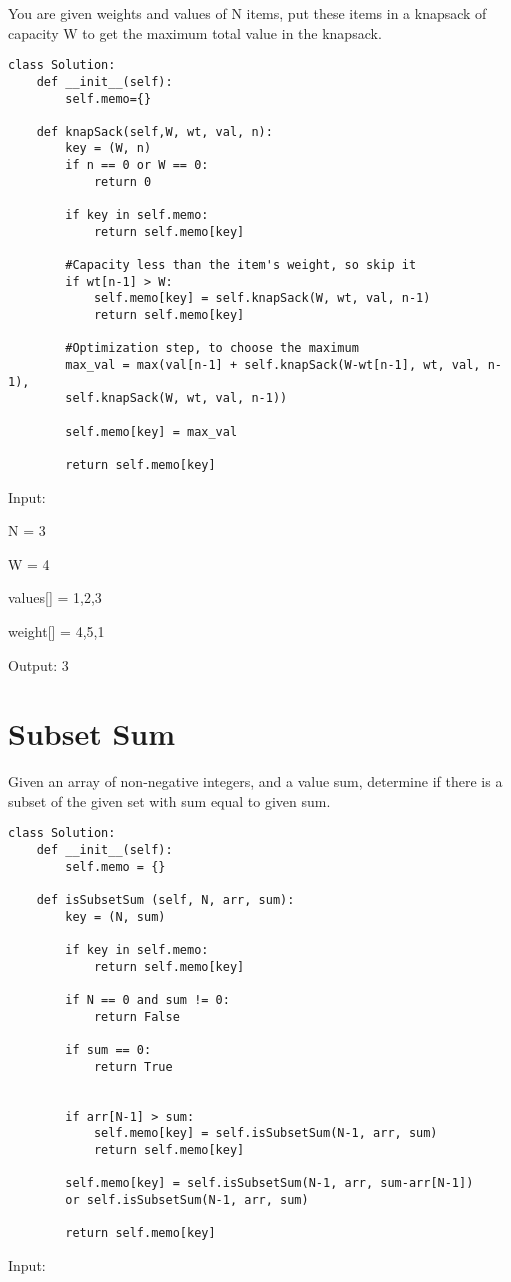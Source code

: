 \documentclass[24pt, a4]{article}
\begin{document}
You are given weights and values of N items, put these items in a knapsack of capacity W to get the maximum total value in the knapsack. 



\begin{lstlisting}
class Solution:
    def __init__(self):
        self.memo={}

    def knapSack(self,W, wt, val, n):
        key = (W, n)
        if n == 0 or W == 0:
            return 0
            
        if key in self.memo:
            return self.memo[key]
        
        #Capacity less than the item's weight, so skip it    
        if wt[n-1] > W:
            self.memo[key] = self.knapSack(W, wt, val, n-1)
            return self.memo[key]
        
        #Optimization step, to choose the maximum    
        max_val = max(val[n-1] + self.knapSack(W-wt[n-1], wt, val, n-1),
        self.knapSack(W, wt, val, n-1))
        
        self.memo[key] = max_val
        
        return self.memo[key]
\end{lstlisting}


Input:

N = 3

W = 4

values[] = {1,2,3}

weight[] = {4,5,1}

Output: 3

\newpage
\section{Subset Sum}

Given an array of non-negative integers, and a value sum, determine if there is a subset of the given set with sum equal to given sum.

\begin{lstlisting}
class Solution:
    def __init__(self):
        self.memo = {}
        
    def isSubsetSum (self, N, arr, sum):
        key = (N, sum)
        
        if key in self.memo:
            return self.memo[key]
            
        if N == 0 and sum != 0:
            return False
        
        if sum == 0:
            return True
            
        
        if arr[N-1] > sum:
            self.memo[key] = self.isSubsetSum(N-1, arr, sum)
            return self.memo[key]
        
        self.memo[key] = self.isSubsetSum(N-1, arr, sum-arr[N-1]) 
        or self.isSubsetSum(N-1, arr, sum)
        
        return self.memo[key]
\end{lstlisting}
Input:
\end{document}

